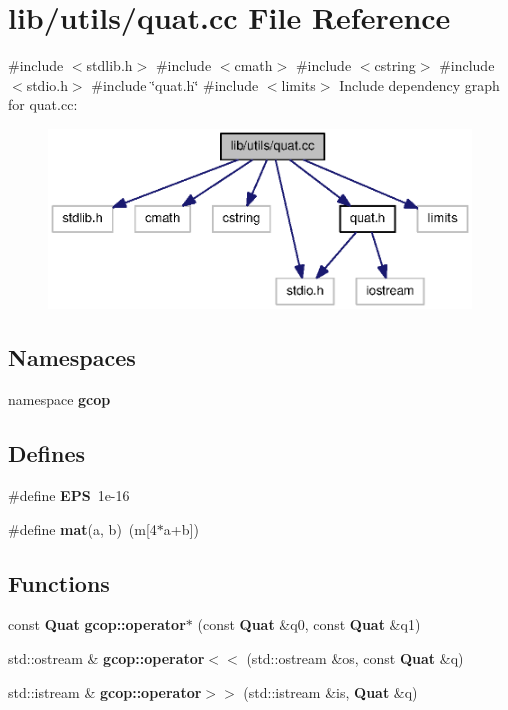 \section{lib/utils/quat.cc \-File \-Reference}
\label{quat_8cc}
{\ttfamily \#include $<$stdlib.\-h$>$}\*
{\ttfamily \#include $<$cmath$>$}\*
{\ttfamily \#include $<$cstring$>$}\*
{\ttfamily \#include $<$stdio.\-h$>$}\*
{\ttfamily \#include \char`\"{}quat.\-h\char`\"{}}\*
{\ttfamily \#include $<$limits$>$}\*
\-Include dependency graph for quat.\-cc\-:\nopagebreak
\begin{figure}[H]
\begin{center}
\leavevmode
\includegraphics[width=350pt]{quat_8cc__incl}
\end{center}
\end{figure}
\subsection*{\-Namespaces}
\begin{DoxyCompactItemize}
\item 
namespace {\bf gcop}
\end{DoxyCompactItemize}
\subsection*{\-Defines}
\begin{DoxyCompactItemize}
\item 
\#define {\bf \-E\-P\-S}~1e-\/16
\item 
\#define {\bf mat}(a, b)~(m[4$\ast$a+b])
\end{DoxyCompactItemize}
\subsection*{\-Functions}
\begin{DoxyCompactItemize}
\item 
const {\bf \-Quat} {\bf gcop\-::operator$\ast$} (const {\bf \-Quat} \&q0, const {\bf \-Quat} \&q1)
\item 
std\-::ostream \& {\bf gcop\-::operator$<$$<$} (std\-::ostream \&os, const {\bf \-Quat} \&q)
\item 
std\-::istream \& {\bf gcop\-::operator$>$$>$} (std\-::istream \&is, {\bf \-Quat} \&q)
\end{DoxyCompactItemize}
